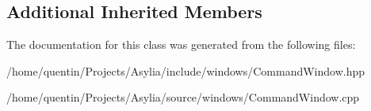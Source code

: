\subsection*{Additional Inherited Members}


The documentation for this class was generated from the following files\-:\begin{DoxyCompactItemize}
\item 
/home/quentin/\-Projects/\-Asylia/include/windows/Command\-Window.\-hpp\item 
/home/quentin/\-Projects/\-Asylia/source/windows/Command\-Window.\-cpp\end{DoxyCompactItemize}
